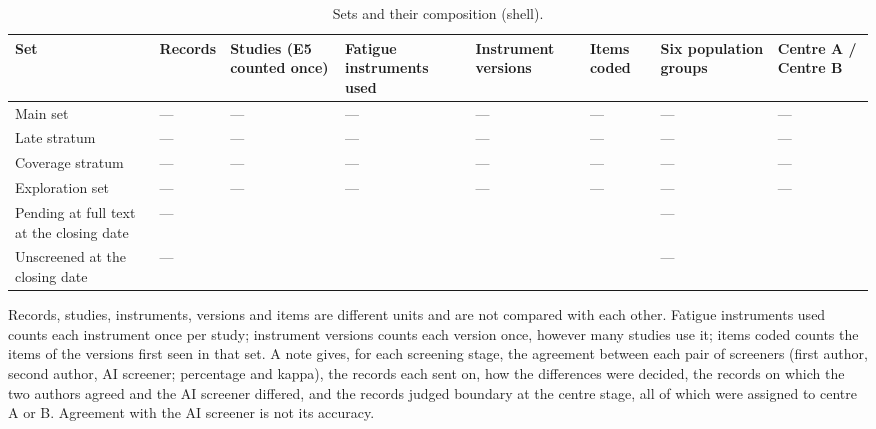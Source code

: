 \begin{table}[!htbp]
\centering
\caption{Sets and their composition (shell).}
\footnotesize
\begin{tabularx}{\linewidth}{p{27mm}XXXXXXX}
\toprule
Set & Records & Studies (E5 counted once) & Fatigue instruments used & Instrument versions & Items coded & Six population groups & Centre A / Centre B \\
\midrule
Main set & --- & --- & --- & --- & --- & --- & --- \\
Late stratum & --- & --- & --- & --- & --- & --- & --- \\
Coverage stratum & --- & --- & --- & --- & --- & --- & --- \\
Exploration set & --- & --- & --- & --- & --- & --- & --- \\
Pending at full text at the closing date & --- & & & & & --- & \\
Unscreened at the closing date & --- & & & & & --- & \\
\bottomrule
\end{tabularx}

\smallskip
\raggedright\footnotesize Records, studies, instruments, versions and items are different units and are not compared
with each other. Fatigue instruments used counts each instrument once per study; instrument versions counts each
version once, however many studies use it; items coded counts the items of the versions first seen in that set. A note
gives, for each screening stage, the agreement between each pair of screeners (first author, second author, AI
screener; percentage and kappa), the records each sent on, how the differences were decided, the records on which the
two authors agreed and the AI screener differed, and the records judged boundary at the centre stage, all of which were
assigned to centre A or B. Agreement with the AI screener is not its accuracy.
\end{table}

